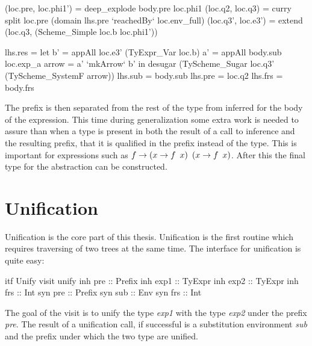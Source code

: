 \begin{code}
   (loc.pre, loc.phi1') = deep_explode body.pre loc.phi1
   (loc.q2,  loc.q3)  = curry split loc.pre (domain lhs.pre `reachedBy` loc.env_full)
   (loc.q3', loc.e3') = extend (loc.q3, (Scheme_Simple loc.b loc.phi1'))
       
   lhs.res = let b'    = appAll loc.e3' (TyExpr_Var loc.b)
                 a'    = appAll body.sub loc.exp_a
                 arrow = a' `mkArrow` b'
             in desugar (TyScheme_Sugar loc.q3' (TyScheme_SystemF arrow))
   lhs.sub = body.sub
   lhs.pre = loc.q2
   lhs.frs = body.frs
\end{code}
The prefix is then separated from the rest of the type from inferred for the body of the expression. This time during generalization some extra work is needed to assure than when a type is present in both the result of a call to inference and the resulting prefix, that it is qualified in the prefix instead of the type. This is important for expressions such as $\\f \rightarrow (\\x \rightarrow f \hspace{5pt} x) \hspace{5pt} (\\x \rightarrow f \hspace{5pt} x)$. After this the final type for the abstraction can be constructed.

\section{Unification}
Unification is the core part of this thesis. Unification is the first routine which requires traversing of two trees at the same time. The interface for unification is quite easy:

\begin{code}
itf Unify
  visit unify
    inh pre  :: Prefix
    inh exp1 :: TyExpr
    inh exp2 :: TyExpr
    inh frs  :: Int
    syn pre  :: Prefix
    syn sub  :: Env
    syn frs  :: Int
\end{code}

The goal of the visit is to unify the type \emph{exp1} with the type \emph{exp2} under the prefix \emph{pre}. The result of a unification call, if successful is a substitution environment \emph{sub} and the prefix under which the two type are unified.

